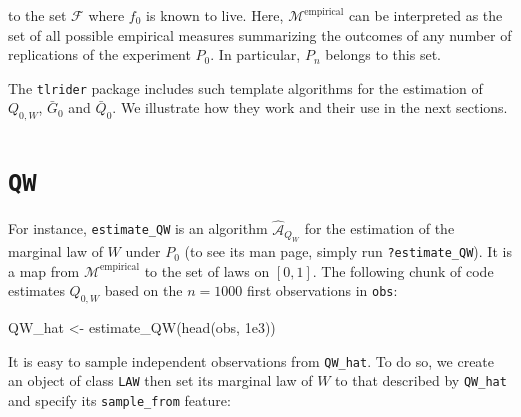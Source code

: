 \documentclass[
  11pt,
  openright,twoside]{book}
\newenvironment{Shaded}{\begin{snugshade}}{\end{snugshade}}
\newcommand{\FloatTok}[1]{\textcolor[rgb]{0.00,0.00,0.81}{#1}}
\newcommand{\FunctionTok}[1]{\textcolor[rgb]{0.00,0.00,0.00}{#1}}
\newcommand{\NormalTok}[1]{#1}
\newcommand{\OtherTok}[1]{\textcolor[rgb]{0.56,0.35,0.01}{#1}}
\newcommand{\Algo}{\widehat{\mathcal{A}}}
\newcommand{\calF}{\mathcal{F}}
\newcommand{\calM}{\mathcal{M}}
\newcommand{\Gbar}{\bar{G}}
\newcommand{\Qbar}{\bar{Q}}
\theoremstyle{definition}
\theoremstyle{definition}
\theoremstyle{definition}
\theoremstyle{definition}
\theoremstyle{remark}
\begin{document}
to the set \(\calF\) where \(f_{0}\) is known to live. Here,
\(\calM^{\text{empirical}}\) can be interpreted as the set of all possible
empirical measures summarizing the outcomes of any number of replications of
the experiment \(P_{0}\). In particular, \(P_{n}\) belongs to this set.

The \texttt{tlrider} package includes such template algorithms for the estimation of
\(Q_{0,W}\), \(\Gbar_{0}\) and \(\Qbar_{0}\). We illustrate how they work and their
use in the next sections.

\hypertarget{nuisance-QW}{%
\section{\texorpdfstring{\texttt{QW}}{QW}}\label{nuisance-QW}}

For instance, \texttt{estimate\_QW} is an algorithm \(\Algo_{Q_{W}}\) for the estimation
of the marginal law of \(W\) under \(P_{0}\) (to see its man page, simply run
\texttt{?estimate\_QW}). It is a map from \(\calM^{\text{empirical}}\) to the set of
laws on \([0,1]\). The following chunk of code estimates \(Q_{0,W}\) based on the
\(n = 1000\) first observations in \texttt{obs}:

\begin{Shaded}
\begin{Highlighting}[]
\NormalTok{QW\_hat }\OtherTok{\textless{}{-}} \FunctionTok{estimate\_QW}\NormalTok{(}\FunctionTok{head}\NormalTok{(obs, }\FloatTok{1e3}\NormalTok{))}
\end{Highlighting}
\end{Shaded}

It is easy to sample independent observations from \texttt{QW\_hat}. To do so, we
create an object of class \texttt{LAW} then set its marginal law of \(W\) to that
described by \texttt{QW\_hat} and specify its \texttt{sample\_from} feature:
\end{document}
